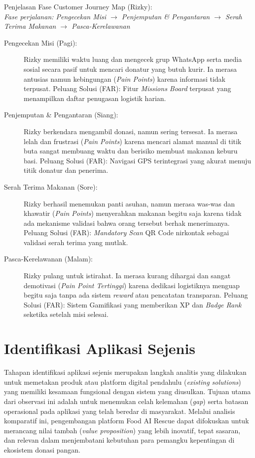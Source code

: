 Penjelasan Fase Customer Journey Map (Rizky): \\
\textit{Fase perjalanan: Pengecekan Misi $\rightarrow$ Penjemputan \& Pengantaran $\rightarrow$ Serah Terima Makanan $\rightarrow$ Pasca-Kerelawanan}
\begin{description}
    \item[\textnormal{Pengecekan Misi (Pagi):}] Rizky memiliki waktu luang dan mengecek grup WhatsApp serta media sosial secara pasif untuk mencari donatur yang butuh kurir. Ia merasa antusias namun kebingungan (\textit{Pain Points}) karena informasi tidak terpusat. Peluang Solusi (FAR): Fitur \textit{Missions Board} terpusat yang menampilkan daftar penugasan logistik harian.
    \item[\textnormal{Penjemputan \& Pengantaran (Siang):}] Rizky berkendara mengambil donasi, namun sering tersesat. Ia merasa lelah dan frustrasi (\textit{Pain Points}) karena mencari alamat manual di titik buta sangat membuang waktu dan berisiko membuat makanan keburu basi. Peluang Solusi (FAR): Navigasi GPS terintegrasi yang akurat menuju titik donatur dan penerima.
    \item[\textnormal{Serah Terima Makanan (Sore):}] Rizky berhasil menemukan panti asuhan, namun merasa was-was dan khawatir (\textit{Pain Points}) menyerahkan makanan begitu saja karena tidak ada mekanisme validasi bahwa orang tersebut berhak menerimanya. Peluang Solusi (FAR): \textit{Mandatory Scan} QR Code nirkontak sebagai validasi serah terima yang mutlak.
    \item[\textnormal{Pasca-Kerelawanan (Malam):}] Rizky pulang untuk istirahat. Ia merasa kurang dihargai dan sangat demotivasi (\textit{Pain Point Tertinggi}) karena dedikasi logistiknya menguap begitu saja tanpa ada sistem \textit{reward} atau pencatatan transparan. Peluang Solusi (FAR): Sistem Gamifikasi yang memberikan XP dan \textit{Badge Rank} seketika setelah misi selesai.
\end{description}

\section{Identifikasi Aplikasi Sejenis}
\par Tahapan identifikasi aplikasi sejenis merupakan langkah analitis yang dilakukan untuk memetakan produk atau platform digital pendahulu (\textit{existing solutions}) yang memiliki kesamaan fungsional dengan sistem yang diusulkan. Tujuan utama dari observasi ini adalah untuk menemukan celah kelemahan (\textit{gap}) serta batasan operasional pada aplikasi yang telah beredar di masyarakat. Melalui analisis komparatif ini, pengembangan platform Food AI Rescue dapat difokuskan untuk merancang nilai tambah (\textit{value proposition}) yang lebih inovatif, tepat sasaran, dan relevan dalam menjembatani kebutuhan para pemangku kepentingan di ekosistem donasi pangan.

